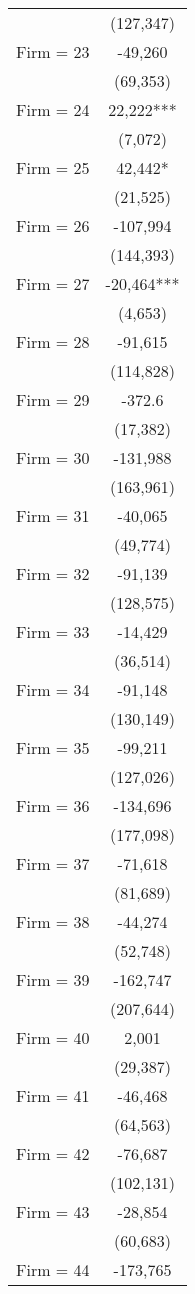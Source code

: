 \begin{tabular}{lc}
 & (127,347) \\
Firm = 23 & -49,260 \\
 & (69,353) \\
Firm = 24 & 22,222*** \\
 & (7,072) \\
Firm = 25 & 42,442* \\
 & (21,525) \\
Firm = 26 & -107,994 \\
 & (144,393) \\
Firm = 27 & -20,464*** \\
 & (4,653) \\
Firm = 28 & -91,615 \\
 & (114,828) \\
Firm = 29 & -372.6 \\
 & (17,382) \\
Firm = 30 & -131,988 \\
 & (163,961) \\
Firm = 31 & -40,065 \\
 & (49,774) \\
Firm = 32 & -91,139 \\
 & (128,575) \\
Firm = 33 & -14,429 \\
 & (36,514) \\
Firm = 34 & -91,148 \\
 & (130,149) \\
Firm = 35 & -99,211 \\
 & (127,026) \\
Firm = 36 & -134,696 \\
 & (177,098) \\
Firm = 37 & -71,618 \\
 & (81,689) \\
Firm = 38 & -44,274 \\
 & (52,748) \\
Firm = 39 & -162,747 \\
 & (207,644) \\
Firm = 40 & 2,001 \\
 & (29,387) \\
Firm = 41 & -46,468 \\
 & (64,563) \\
Firm = 42 & -76,687 \\
 & (102,131) \\
Firm = 43 & -28,854 \\
 & (60,683) \\
Firm = 44 & -173,765 \\

\end{tabular}
